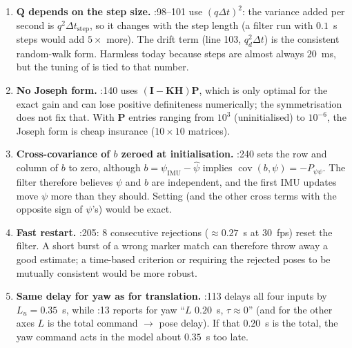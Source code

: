 \begin{review}
\begin{enumerate}[leftmargin=*]
  the mission's request (), whereas the live EKF uses , recorded in
   (). Hold corrections and guards are therefore missing in the replay. Also, the
  replay applies  on the ground (:52, no  test, unlike
  :93) and never calls  nor .
\item \textbf{$\mathbf Q$ depends on the step size.} :98--101 use $(q\Delta t)^2$: the variance added per
  second is $q^2\Delta t_{\text{step}}$, so it changes with the step length (a filter run with $0.1$~s steps would add $5\times$
  more). The drift term (line 103, $q_d^2\Delta t$) is the consistent random-walk form. Harmless today because steps are
  almost always $20$~ms, but the tuning of  is tied to that number.
\item \textbf{No Joseph form.} :140 uses $(\mathbf I-\mathbf K\mathbf H)\mathbf P$, which is only optimal
  for the exact gain and can lose positive definiteness numerically; the symmetrisation does not fix that. With
  $\mathbf P$ entries ranging from $10^3$ (uninitialised) to $10^{-6}$, the Joseph form is cheap insurance
  ($10\times10$ matrices).
\item \textbf{Cross-covariance of $b$ zeroed at initialisation.} :240 sets the row and column of $b$
  to zero, although $b = \psi_{\text{IMU}} - \hat\psi$ implies $\operatorname{cov}(b,\psi) = -P_{\psi\psi}$. The filter
  therefore believes $\psi$ and $b$ are independent, and the first IMU updates move $\psi$ more than they should.
  Setting  (and the other cross terms with the opposite sign of
  $\psi$'s) would be exact.
\item \textbf{Fast restart.} :205: 8 consecutive rejections ($\approx0.27$~s at $30$~fps) reset the filter.
  A short burst of a wrong marker match can therefore throw away a good estimate; a time-based criterion or requiring the
  rejected poses to be mutually consistent would be more robust.
\item \textbf{Same delay for yaw as for translation.} :113 delays all four inputs by $L_u = 0.35$~s,
  while :13 reports for yaw ``$L$ $0.20$~s, $\tau\approx0$'' (and for the other axes $L$ is the total
  command $\to$ pose delay). If that $0.20$~s is the total, the yaw command acts in the model about $0.35$~s too late.

\end{enumerate}
\end{review}
